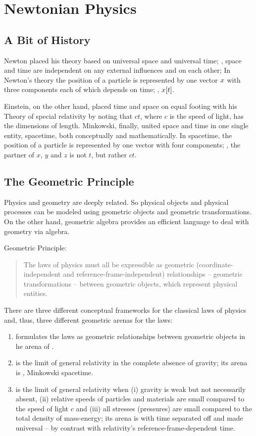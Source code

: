 \section{Newtonian Physics}

\subsection{A Bit of History}
Newton placed his theory based on universal space and universal time; \ie, space and time are independent on any external influences and on each other; In Newton's theory the position of a particle is represented by one vector $x$ with three components each of which depends on time; \ie, $x\!\left[{t}\right]$.

Einstein, on the other hand, placed time and space on equal footing with his Theory of special relativity by noting that $ct$, where $c$ is the speed of light, has the dimensions of length. Minkowski, finally, united space and time in one single entity, spacetime, both conceptually and mathematically. In spacetime, the position of a particle is represented by one vector with four components; \ie, the partner of $x$, $y$ and $z$ is not $t$, but rather $ct$.


\subsection{The Geometric Principle}
Physics and geometry are deeply related. So physical objects and physical processes can be modeled using geometric objects and geometric transformations. On the other hand, geometric algebra provides an efficient language to deal with geometry via algebra.

Geometric Principle:
\begin{quote}
The laws of physics must all be expressible as geometric (coordinate-independent and reference-frame-independent) relationships -- geometric transformations -- between geometric objects, which represent physical entities.
\end{quote}

There are three different conceptual frameworks for the classical laws of physics and, thus, three different geometric arenas for the laws:
\begin{enumerate}
\item {} formulates the laws as geometric relationships between geometric objects in he arena of .
\item {} is the limit of general relativity in the complete absence of gravity; its arena is , \aka Minkowski spacetime.
\item {} is the limit of general relativity when (i) gravity is weak but not necessarily absent, (ii) relative speeds of particles and materials are small compared to the speed of light $c$ and (iii) all stresses (pressures) are small compared to the total density of mass-energy; its arena is  with time separated off and made universal -- by contrast with relativity's reference-frame-dependent time.
\end{enumerate}

